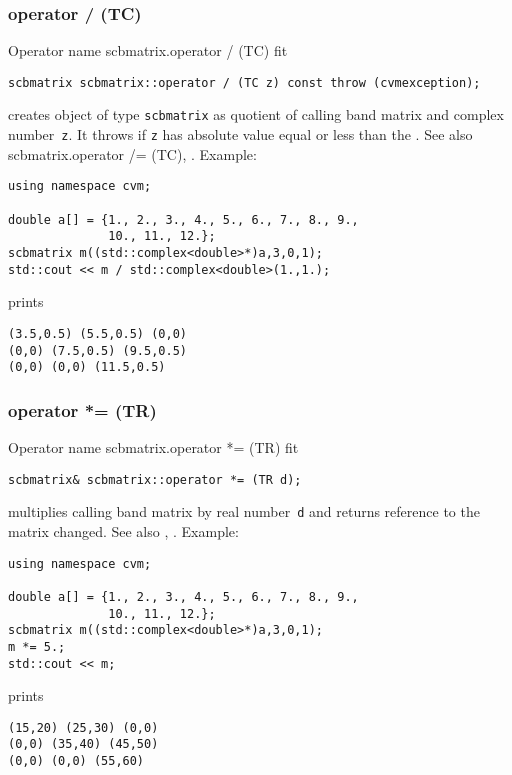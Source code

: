 \subsubsection{operator / (TC)}
Operator%
\pdfdest name {scbmatrix.operator / (TC)} fit
\begin{verbatim}
scbmatrix scbmatrix::operator / (TC z) const throw (cvmexception);
\end{verbatim}
creates  object of type \verb"scbmatrix" as  quotient of
 calling band matrix and  complex number~\verb"z". 
It throws
if \verb"z" has  absolute value equal or less than the
.
See also 
{scbmatrix.operator /= (TC)},
.
Example:
\begin{Verbatim}
using namespace cvm;

double a[] = {1., 2., 3., 4., 5., 6., 7., 8., 9.,
              10., 11., 12.};
scbmatrix m((std::complex<double>*)a,3,0,1);
std::cout << m / std::complex<double>(1.,1.);
\end{Verbatim}
prints
\begin{Verbatim}
(3.5,0.5) (5.5,0.5) (0,0)
(0,0) (7.5,0.5) (9.5,0.5)
(0,0) (0,0) (11.5,0.5)
\end{Verbatim}
\newpage



\subsubsection{operator *= (TR)}
Operator%
\pdfdest name {scbmatrix.operator *= (TR)} fit
\begin{verbatim}
scbmatrix& scbmatrix::operator *= (TR d);
\end{verbatim}
multiplies  calling band matrix by  real number~\verb"d"
and returns  reference to
the matrix changed.
See also ,
.
Example:
\begin{Verbatim}
using namespace cvm;

double a[] = {1., 2., 3., 4., 5., 6., 7., 8., 9.,
              10., 11., 12.};
scbmatrix m((std::complex<double>*)a,3,0,1);
m *= 5.;
std::cout << m;
\end{Verbatim}
prints
\begin{Verbatim}
(15,20) (25,30) (0,0)
(0,0) (35,40) (45,50)
(0,0) (0,0) (55,60)
\end{Verbatim}
\newpage



